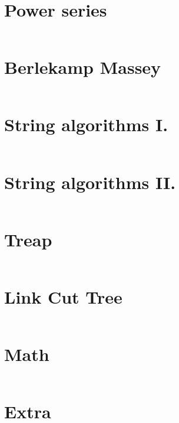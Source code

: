 \documentclass[12pt,english]{article}
\begin{document}
\section{Power series}
\inputminted[autogobble,breaklines,mathescape,linenos,numbersep=5pt,xleftmargin=0pt,fontsize=\footnotesize]{cpp}{codes/power_series.tex}

\section{Berlekamp Massey}
\inputminted[autogobble,breaklines,mathescape,linenos,numbersep=5pt,xleftmargin=0pt,fontsize=\footnotesize]{cpp}{codes/berlekamp_massey.tex}

\section{String algorithms I.}
\inputminted[autogobble,breaklines,mathescape,linenos,numbersep=5pt,xleftmargin=0pt,fontsize=\footnotesize]{cpp}{codes/str_alg.tex}

\section{String algorithms II.}
\inputminted[autogobble,breaklines,mathescape,linenos,numbersep=5pt,xleftmargin=0pt,fontsize=\footnotesize]{cpp}{codes/suff_arr.tex}

\section{Treap}
\inputminted[autogobble,breaklines,mathescape,linenos,numbersep=5pt,xleftmargin=0pt,fontsize=\footnotesize]{cpp}{codes/treap.tex}

\section{Link Cut Tree}
\inputminted[autogobble,breaklines,mathescape,linenos,numbersep=5pt,xleftmargin=0pt,fontsize=\footnotesize]{cpp}{codes/link_cut_tree.tex}

\section{Math}
\inputminted[autogobble,breaklines,mathescape,linenos,numbersep=5pt,xleftmargin=0pt,fontsize=\footnotesize]{cpp}{codes/extra_math.tex}

\section{Extra}
\inputminted[autogobble,breaklines,mathescape,linenos,numbersep=5pt,xleftmargin=0pt,fontsize=\footnotesize]{cpp}{codes/extra.tex}
\end{document}
